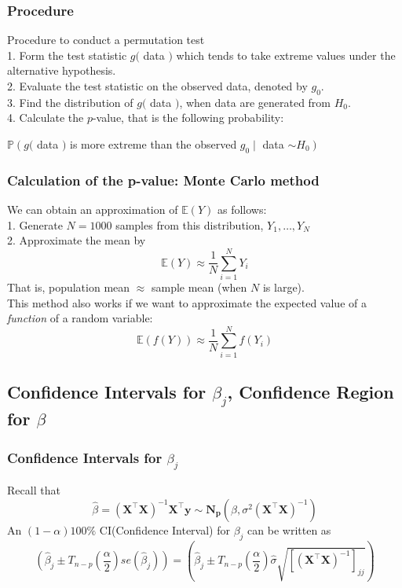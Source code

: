 \documentclass[11pt,a4paper]{article}
\begin{document}
\subsubsection{Procedure}
Procedure to conduct a permutation test\\
1. Form the test statistic $g($ data $)$ which tends to take extreme values under the alternative hypothesis.\\
2. Evaluate the test statistic on the observed data, denoted by $g_{0}$.\\
3. Find the distribution of $g($ data $)$, when data are generated from $H_{0}$.\\
4. Calculate the $p$-value, that is the following probability:
\begin{center}
    $\mathbb{P}\left(g(\right.$ data $)$ is more extreme than the observed $g_{0} \mid$ data $\left.\sim H_{0}\right)$
\end{center}

\subsubsection{Calculation of the p-value: Monte Carlo method}
We can obtain an approximation of $\mathbb{E}(Y)$ as follows:\\
1. Generate $N=1000$ samples from this distribution, $Y_{1}, \ldots, Y_{N}$\\
2. Approximate the mean by
$$
\mathbb{E}(Y) \approx \frac{1}{N} \sum_{i=1}^{N} Y_{i}
$$
That is, population mean $\approx$ sample mean (when $N$ is large).\\

This method also works if we want to approximate the expected value of a \textit{function} of a random variable:
$$
\mathbb{E}(f(Y)) \approx \frac{1}{N} \sum_{i=1}^{N} f\left(Y_{i}\right)
$$

\subsection{Confidence Intervals for $\beta_j$, Confidence Region for $\beta$}
\subsubsection{Confidence Intervals for $\beta_j$}
Recall that
$$\hat{\beta}=\left(\mathbf{X}^{\top} \mathbf{X}\right)^{-1} \mathbf{X}^{\top} \mathbf{y} \sim \mathbf{N}_{\mathbf{p}}\left(\beta, \sigma^{2}\left(\mathbf{X}^{\top} \mathbf{X}\right)^{-1}\right)$$
An $(1-\alpha)100\%$ CI(Confidence Interval) for $\beta_j$ can be written as
$$(\hat{\beta}_j \pm T_{n-p}(\frac{\alpha}{2})se(\hat{\beta}_j))=(\hat{\beta}_j \pm T_{n-p}(\frac{\alpha}{2})\hat{\sigma}\sqrt{[\left(\mathbf{X}^{\top} \mathbf{X}\right)^{-1}]_{jj}})$$
\end{document}
